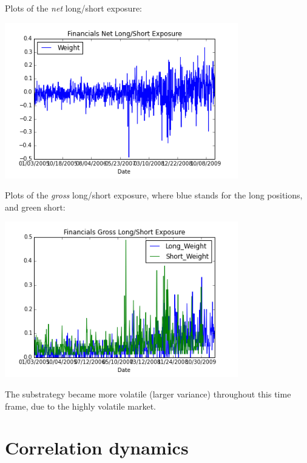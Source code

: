 \documentclass[11pt,letter]{article}
\begin{document}
Plots of the \textit{net} long/short exposure:

\begin{center}
\includegraphics[width=4in,keepaspectratio]{3d}
\end{center}

Plots of the \textit{gross} long/short exposure, where blue stands for the long positions, and green short:

\begin{center}
\includegraphics[width=4in,keepaspectratio]{3d_2}
\end{center}

The substrategy became more volatile (larger variance) throughout this time frame, due to the highly volatile market.

\section{Correlation dynamics}
\end{document}
